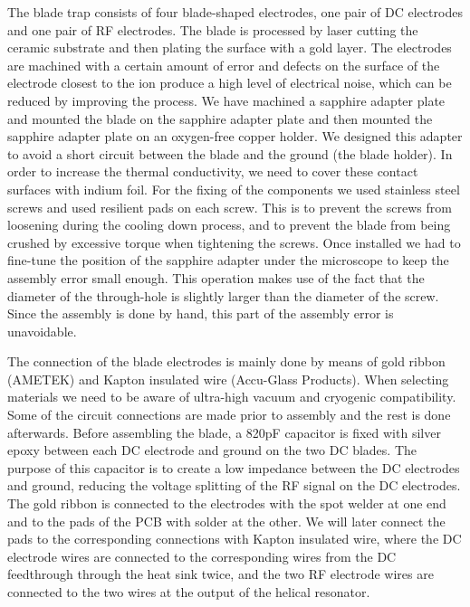 The blade trap consists of four blade-shaped electrodes, one pair of DC electrodes and one pair of RF electrodes. The blade is processed by laser cutting the ceramic substrate and then plating the surface with a gold layer. The electrodes are machined with a certain amount of error and defects on the surface of the electrode closest to the ion produce a high level of electrical noise, which can be reduced by improving the process. We have machined a sapphire adapter plate and mounted the blade on the sapphire adapter plate and then mounted the sapphire adapter plate on an oxygen-free copper holder. We designed this adapter to avoid a short circuit between the blade and the ground (the blade holder). In order to increase the thermal conductivity, we need to cover these contact surfaces with indium foil. For the fixing of the components we used stainless steel screws and used resilient pads on each screw. This is to prevent the screws from loosening during the cooling down process, and to prevent the blade from being crushed by excessive torque when tightening the screws. Once installed we had to fine-tune the position of the sapphire adapter under the microscope to keep the assembly error small enough. This operation makes use of the fact that the diameter of the through-hole is slightly larger than the diameter of the screw. Since the assembly is done by hand, this part of the assembly error is unavoidable.

The connection of the blade electrodes is mainly done by means of gold ribbon (AMETEK) and Kapton insulated wire (Accu-Glass Products). When selecting materials we need to be aware of ultra-high vacuum and cryogenic compatibility. Some of the circuit connections are made prior to assembly and the rest is done afterwards. Before assembling the blade, a 820pF capacitor is fixed with silver epoxy between each DC electrode and ground on the two DC blades. The purpose of this capacitor is to create a low impedance between the DC electrodes and ground, reducing the voltage splitting of the RF signal on the DC electrodes. The gold ribbon is connected to the electrodes with the spot welder at one end and to the pads of the PCB with solder at the other. We will later connect the pads to the corresponding connections with Kapton insulated wire, where the DC electrode wires are connected to the corresponding wires from the DC feedthrough through the heat sink twice, and the two RF electrode wires are connected to the two wires at the output of the helical resonator.



